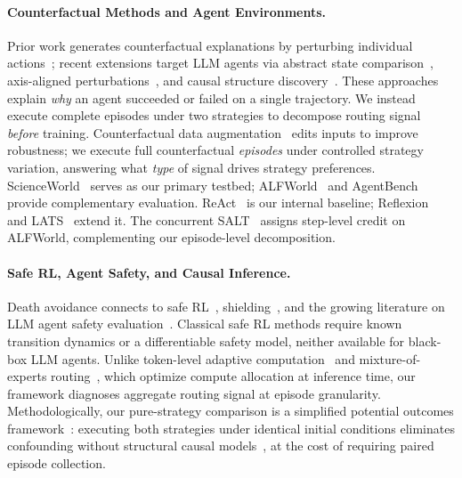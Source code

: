 \paragraph{Counterfactual Methods and Agent Environments.}
Prior work generates counterfactual explanations by perturbing individual actions~\citep{olson2021counterfactual,gajcin2023counterfactual,amitai2024explaining}; recent extensions target LLM agents via abstract state comparison~\citep{pona2025abstract}, axis-aligned perturbations~\citep{axis-2026}, and causal structure discovery~\citep{cso-2026}. These approaches explain \emph{why} an agent succeeded or failed on a single trajectory. We instead execute complete episodes under two strategies to decompose routing signal \emph{before} training. Counterfactual data augmentation~\citep{kaushik2020learning} edits inputs to improve robustness; we execute full counterfactual \emph{episodes} under controlled strategy variation, answering what \emph{type} of signal drives strategy preferences. ScienceWorld~\citep{scienceworld-2022} serves as our primary testbed; ALFWorld~\citep{alfworld-2021} and AgentBench~\citep{agentbench-2024} provide complementary evaluation. ReAct~\citep{react-2023} is our internal baseline; Reflexion~\citep{reflexion-2023} and LATS~\citep{lats-2024} extend it. The concurrent SALT~\citep{salt-2026} assigns step-level credit on ALFWorld, complementing our episode-level decomposition.

\paragraph{Safe RL, Agent Safety, and Causal Inference.}
Death avoidance connects to safe RL~\citep{garcia2015comprehensive,achiam2017cpo}, shielding~\citep{alshiekh2018safe}, and the growing literature on LLM agent safety evaluation~\citep{ruan2024failures,saferoute-2025,agent-safetybench-2024}. Classical safe RL methods require known transition dynamics or a differentiable safety model, neither available for black-box LLM agents. Unlike token-level adaptive computation~\citep{mixture-of-depths-2024,xin2020deebert} and mixture-of-experts routing~\citep{switch-transformer-2022}, which optimize compute allocation at inference time, our framework diagnoses aggregate routing signal at episode granularity. Methodologically, our pure-strategy comparison is a simplified potential outcomes framework~\citep{rubin1974estimating}: executing both strategies under identical initial conditions eliminates confounding without structural causal models~\citep{pearl2009causality}, at the cost of requiring paired episode collection.
